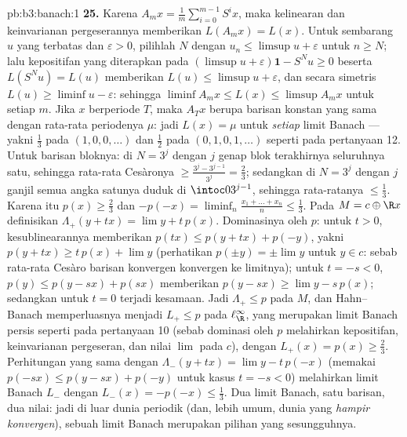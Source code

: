 \begin{solution}{pb:b3:banach:1}
\textbf{25.} Karena $A_mx = \frac1m\sum_{i=0}^{m-1}S^ix$, maka
kelinearan dan keinvarianan pergeserannya memberikan $L(A_mx) = L(x)$. Untuk sembarang
$u$ yang terbatas dan $\varepsilon > 0$, pilihlah $N$ dengan $u_n \leq
\limsup u + \varepsilon$ untuk $n \geq N$; lalu kepositifan yang diterapkan
pada $(\limsup u + \varepsilon)\mathbf 1 - S^Nu \geq 0$ beserta
$L(S^Nu) = L(u)$ memberikan $L(u) \leq \limsup u + \varepsilon$,
dan secara simetris $L(u) \geq \liminf u - \varepsilon$: sehingga
$\liminf A_mx \leq L(x) \leq \limsup A_mx$ untuk setiap $m$. Jika
$x$ berperiode $T$, maka $A_Tx$ berupa barisan konstan yang sama dengan
rata-rata periodenya $\mu$: jadi $L(x) = \mu$ untuk \emph{setiap} limit
Banach --- yakni $\frac13$ pada $(1,0,0,\dots)$ dan $\frac12$ pada
$(0,1,0,1,\dots)$ seperti pada pertanyaan 12. Untuk barisan bloknya:
di $N = 3^j$ dengan $j$ genap blok terakhirnya seluruhnya satu, sehingga
rata-rata Cesàronya $\geq \frac{3^j - 3^{j-1}}{3^j} = \frac23$;
sedangkan di $N = 3^j$ dengan $j$ ganjil semua angka satunya duduk di $\intoc0
{3^{j-1}}$, sehingga rata-ratanya $\leq \frac13$. Karena itu $p(x) \geq
\frac23$ dan $-p(-x) = \liminf_n\frac{x_1 + \dots + x_n}n
\leq \frac13$. Pada $M = c \oplus \R x$ definisikan $\Lambda_+(y +
tx) = \lim y + t\,p(x)$. Dominasinya oleh $p$: untuk $t > 0$,
kesublinearannya memberikan $p(tx) \leq p(y + tx) + p(-y)$, yakni
$p(y + tx) \geq t\,p(x) + \lim y$ (perhatikan $p(\pm y) = \pm\lim
y$ untuk $y \in c$: sebab rata-rata Cesàro barisan konvergen
konvergen ke limitnya); untuk $t = -s < 0$, $p(y) \leq p(y -
sx) + p(sx)$ memberikan $p(y - sx) \geq \lim y - s\,p(x)$; sedangkan untuk $t
= 0$ terjadi kesamaan. Jadi $\Lambda_+ \leq p$ pada $M$, dan
Hahn--Banach memperluasnya menjadi $L_+ \leq p$ pada $\ell^\infty_\R$,
yang merupakan limit Banach persis seperti pada pertanyaan 10 (sebab dominasi
oleh $p$ melahirkan kepositifan, keinvarianan pergeseran, dan nilai
$\lim$ pada $c$), dengan $L_+(x) = p(x) \geq \frac23$. Perhitungan yang sama
dengan $\Lambda_-(y + tx) = \lim y - t\,p(-x)$
(memakai $p(-sx) \leq p(y - sx) + p(-y)$ untuk kasus $t = -s
< 0$) melahirkan limit Banach $L_-$ dengan $L_-(x) = -p(-x) \leq
\frac13$. Dua limit Banach, satu barisan, dua nilai:
jadi di luar dunia periodik (dan, lebih umum, dunia yang \emph{hampir
konvergen}), sebuah limit Banach merupakan pilihan yang sesungguhnya.

\end{solution}
